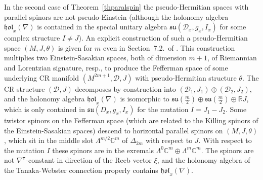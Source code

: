 \documentclass{amsart}
\theoremstyle{plain}
\theoremstyle{definition}
\def\su{\mathfrak{su}}
\newcommand{\hol}{\mathfrak{hol}}
\newcommand{\bt}{{\boldsymbol{\tau}}}
\newcommand{\Real}{\mathbb{R}}
\newcommand{\Co}{\mathbb{C}}
\newcommand{\1}{\mathbf{1}}
\newcommand{\D}{{\mathcal D}}
\newcommand{\+}{\oplus}
\begin{document}
 
In the second case of Theorem~\ref{thparalspin} the pseudo-Hermitian 
spaces with parallel spinors  are not pseudo-Einstein (although the 
holonomy algebra $\hol_x(\nabla)$ is contained in the special unitary algebra
$\su(\D_x,g_x,I_x)$ for some complex structure $I\neq J$).
An explicit  construction of such a pseudo-Hermitian space $(M,J,\theta)$                  
is given for  $m$ even in Section~7.2.~of \cite{Habib}. This construction
multiplies two Einstein-Sasakian spaces, both of  dimension $m+1$,
of Riemannian and Lorentzian signature, resp., to produce the  Fefferman 
space of some underlying CR manifold $(M^{2m+1},\mathcal{D},J)$ with 
pseudo-Hermitian structure $\theta$. The CR structure $(\mathcal{D},J)$  
decomposes by construction into $(\mathcal{D}_1,J_1)\oplus(\mathcal{D}_2,J_2)$, and
the holonomy algebra $\hol_x(\nabla)$ is isomorphic to 
$\su(\frac{m}{2})\oplus\su(\frac{m}{2})\oplus \Real J$, which is only contained
in $\su(D_x,g_x,I_x)$ for the mutation $I=J_1-J_2$. Some twistor spinors on the 
Fefferman space (which are related to the Killing spinors
of the Einstein-Sasakian spaces) descend to horizontal parallel spinors on $(M,J,\theta)$, which sit
in the middle slot $\Lambda^{m/2}\Co^m$ of   $\Delta_{2m}$ with respect to $J$. 
With respect to the mutation $I$ these spinors are in the exremals 
$\Lambda^0\Co^m\oplus \Lambda^m\Co^m$. The spinors are not $\nabla^\bt$-constant 
in direction of the Reeb vector $\xi$, and the holonomy algebra of the Tanaka-Webster 
connection properly contains  $\hol_x(\nabla)$.
\end{document}
